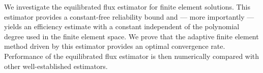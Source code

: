 We investigate the equilibrated flux estimator for finite element solutions. This estimator
provides a constant-free reliability bound and --- more importantly --- yields an efficiency estimate
with a constant independent of the polynomial degree
used in the finite element space. We prove that the adaptive finite element method driven by this estimator provides an optimal convergence rate.
Performance of the equilibrated flux estimator is then numerically compared with other well-established estimators.

